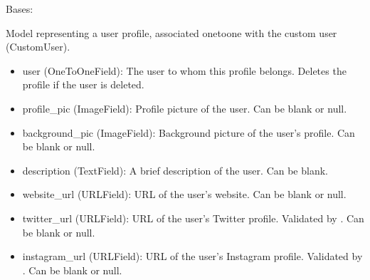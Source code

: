 \documentclass[letterpaper,10pt,english]{sphinxmanual}
\begin{document}

\begin{fulllineitems}
\label{\detokenize{modules/models:account.models.UserProfile}}
\pysigstartsignatures
{}
\pysigstopsignatures
\sphinxAtStartPar
Bases: 

\sphinxAtStartPar
Model representing a user profile, associated one\sphinxhyphen{}to\sphinxhyphen{}one with the custom user (CustomUser).
\begin{description}
\begin{itemize}
\item {} 
\sphinxAtStartPar
user (OneToOneField): The user to whom this profile belongs. Deletes the profile if the user is deleted.

\item {} 
\sphinxAtStartPar
profile\_pic (ImageField): Profile picture of the user. Can be blank or null.

\item {} 
\sphinxAtStartPar
background\_pic (ImageField): Background picture of the user’s profile. Can be blank or null.

\item {} 
\sphinxAtStartPar
description (TextField): A brief description of the user. Can be blank.

\item {} 
\sphinxAtStartPar
website\_url (URLField): URL of the user’s website. Can be blank or null.

\item {} 
\sphinxAtStartPar
twitter\_url (URLField): URL of the user’s Twitter profile. Validated by . Can be blank or null.

\item {} 
\sphinxAtStartPar
instagram\_url (URLField): URL of the user’s Instagram profile. Validated by . Can be blank or null.

\end{itemize}

\end{description}


\end{fulllineitems}
\end{document}
